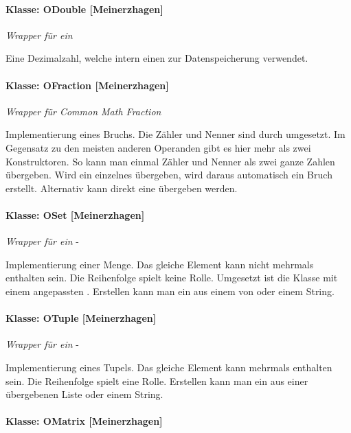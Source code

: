 \paragraph{Klasse: ODouble [Meinerzhagen]}

\textit{Wrapper für ein} 

Eine Dezimalzahl, welche intern einen  zur Datenspeicherung verwendet.


\paragraph{Klasse: OFraction [Meinerzhagen]}

\textit{Wrapper für Common Math Fraction}

Implementierung eines Bruchs. Die Zähler und Nenner sind durch  umgesetzt. Im Gegensatz zu den meisten anderen Operanden gibt es hier mehr als zwei Konstruktoren. So kann man einmal Zähler und Nenner als zwei ganze Zahlen übergeben. Wird ein einzelnes  übergeben, wird daraus automatisch ein Bruch erstellt. Alternativ kann direkt eine  übergeben werden.

\paragraph{Klasse: OSet [Meinerzhagen]}

\textit{Wrapper für ein} -

Implementierung einer Menge. Das gleiche Element kann nicht mehrmals enthalten sein. Die Reihenfolge spielt keine Rolle. Umgesetzt ist die Klasse mit einem angepassten . Erstellen kann man ein  aus einem  von  oder einem String.

\paragraph{Klasse: OTuple [Meinerzhagen]}

\textit{Wrapper für ein} -

Implementierung eines Tupels. Das gleiche Element kann mehrmals enthalten sein. Die Reihenfolge spielt eine Rolle. Erstellen kann man ein  aus einer übergebenen Liste oder einem String.

\paragraph{Klasse: OMatrix [Meinerzhagen]}

